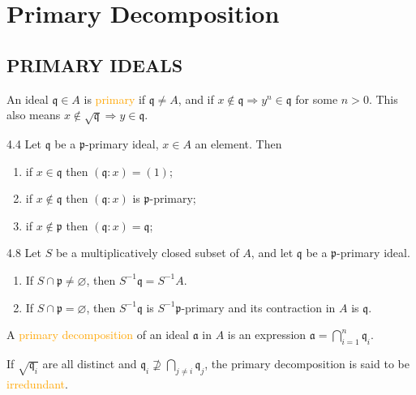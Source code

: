 \chapter{Primary Decomposition}

\section*{PRIMARY IDEALS}

\begin{definition}
	An ideal $\mathfrak{q}\in A$ is \textcolor{orange}{primary} if $\mathfrak{q}\neq A$, and if $x\notin\mathfrak{q}\Rightarrow y^n\in\mathfrak{q}$ for some $n>0$. This also means $x\notin\sqrt{\mathfrak{q}}\Rightarrow y\in\mathfrak{q}$.
\end{definition}

\begin{proposition}{4.4}
	Let $\mathfrak{q}$ be a $\mathfrak{p}$-primary ideal, $x\in A$ an element. Then
	\begin{enumerate}[label=\textup{(\roman*)}]
		\item if $x\in\mathfrak{q}$ then $(\mathfrak{q}:x)=(1)$;
		\item if $x\notin\mathfrak{q}$ then $(\mathfrak{q}:x)$ is $\mathfrak{p}$-primary;
		\item if $x\notin\mathfrak{p}$ then $(\mathfrak{q}:x)=\mathfrak{q}$;
	\end{enumerate}
\end{proposition}

\begin{proposition}{4.8}
	Let $S$ be a multiplicatively closed subset of $A$, and let $\mathfrak{q}$ be a $\mathfrak{p}$-primary ideal.
	\begin{enumerate}[label=\textup{(\roman*)}]
		\item If $S\cap\mathfrak{p}\neq\varnothing$, then $S^{-1}\mathfrak{q}=S^{-1}A$.
		\item If $S\cap\mathfrak{p}=\varnothing$, then $S^{-1}\mathfrak{q}$ is $S^{-1}\mathfrak{p}$-primary and its contraction in $A$ is $\mathfrak{q}$.
	\end{enumerate}
\end{proposition}

\begin{definition}
	A \textcolor{orange}{primary decomposition} of an ideal $\mathfrak{a}$ in $A$ is an expression $\mathfrak{a}=\bigcap_{i=1}^n\mathfrak{q}_i$.
	
	If $\sqrt{\mathfrak{q}_i}$ are all distinct and $\mathfrak{q}_i\nsupseteq\bigcap_{j\neq i}\mathfrak{q}_j$, the primary decomposition is said to be \textcolor{orange}{irredundant}.
\end{definition}

